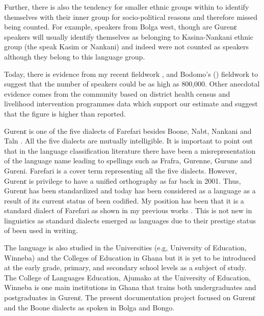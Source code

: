 \documentclass[output=paper,colorlinks,citecolor=brown]{langscibook}
\begin{document}
Further, there is also the tendency for smaller ethnic groups within to identify themselves with their inner group for socio-political reasons and therefore missed being counted. For example, speakers from Bolga west, though are Gurenɛ speakers will usually identify themselves as belonging to Kasina-Nankani ethnic group (the speak Kasim or Nankani) and indeed were not counted as speakers although they belong to this language group. 

Today, there is evidence from my recent fieldwork \citep{Atintono2013, Atintono2020}, and Bodomo's (\citeyear{Bodomo2004, Bodomo2020}) fieldwork to suggest that the number of speakers could be as high as 800,000. Other anecdotal evidence comes from the community based on district health census and livelihood intervention programmes data which support our estimate and suggest that the figure is higher than reported. 

Gurenɛ is one of the five dialects of Farefari besides Boone, Nabt, Nankani and Taln \citep{Dakubu1995, Nsoh1997, Nsoh2011, Atintono2002, Atintono2004, Atintono2011, Atintono2013, Atintono2019}. All the five dialects are mutually intelligible. It is important to point out that in the language classification literature there have been a misrepresentation of the language name leading to spellings such as Frafra, Gurenne, Gurune and Gureni. Farefari is a cover term representing all the five dialects. However, Gurenɛ is privilege to have a unified orthography as far back in 2001. Thus, Gurenɛ has been standardized and today has been considered as a language as a result of its current status of been codified. My position has been that it is a standard dialect of Farefari as shown in my previous works \citep{Atintono2002, Atintono2004, Atintono2011, Atintono2013}. This is not new in linguistics as standard dialects emerged as languages due to their prestige status of been used in writing.

The language is also studied in the Universities (e.g, University of Education, Winneba) and the Colleges of Education in Ghana but it is yet to be introduced at the early grade, primary, and secondary school levels as a subject of study. The College of Languages Education, Ajumako at the University of Education, Winneba is one main institutions in Ghana that trains both undergraduates and postgraduates in Gurenɛ. The present documentation project focused on Gurenɛ and the Boone dialects as spoken in Bolga and Bongo.
\end{document}
